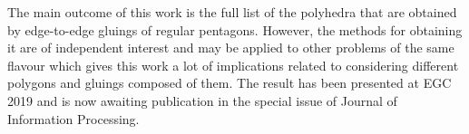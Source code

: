 \documentclass[a4paper,11pt]{article}
\theoremstyle{definition}
\begin{document}
The main outcome of this work is the full list of the polyhedra that are obtained by edge-to-edge gluings of regular pentagons. However, the methods for obtaining it are of independent interest and may be applied to other problems of the same flavour which gives this work a lot of implications related to considering different polygons and gluings composed of them. The result has been presented at EGC 2019 and is now awaiting publication in the special issue of Journal of Information Processing.



\end{document}
